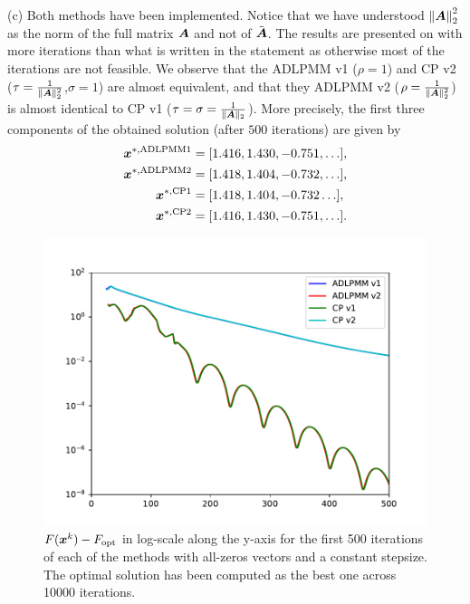     \indent (c) Both methods have been implemented. Notice that we have understood $\left\|\boldsymbol A\right\|_2^2$ as the norm of the full matrix $\boldsymbol A$ and not of $\Tilde{\boldsymbol A}$. The results are presented on  with more iterations than what is written in the statement as otherwise most of the iterations are not feasible. We observe that the ADLPMM v1 ($\rho =1$) and CP v2 ($\tau = \frac{1}{\|\boldsymbol A\|^2_2}$,$\sigma=1$) are almost equivalent, and that they ADLPMM v2 ($\rho = \frac{1}{\|\boldsymbol A\|^2_2}$) is almost identical to CP v1 ($\tau = \sigma = \frac{1}{\|\boldsymbol A\|_2}$). More precisely, the first three components of the obtained solution (after $500$ iterations) are given by
           \begin{align*}
       \boldsymbol x^{*,\text{ADLPMM1}} &= [ 1.416,  1.430, -0.751,\hdots],\\
        \boldsymbol x^{*,\text{ADLPMM2}} &= [1.418,  1.404, -0.732,\hdots],\\
        \boldsymbol x^{*,\text{CP1}} &= [1.418,  1.404 , -0.732\hdots],\\
        \boldsymbol x^{*,\text{CP2}} &= [1.416,  1.430, -0.751 ,\hdots]. \\
       \end{align*}
    \begin{figure}[H]
    \centering
    \includegraphics[width=14cm]{images/part3_ex2_fig1.pdf}
    \caption{$F(\boldsymbol x^k)-F_{\text{opt}}$ in log-scale along the 
  y-axis for the first 500 iterations of each of the methods 
  with all-zeros vectors and a constant stepsize. The optimal solution has been computed as the best one across 10000 iterations. }
  \label{fig:ex4}
\end{figure}

